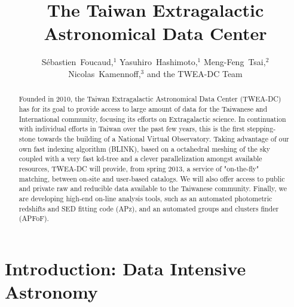 
\resetcounters





\title{The Taiwan Extragalactic Astronomical Data Center}
\author{S\'ebastien~Foucaud,$^1$ Yasuhiro~Hashimoto,$^1$ Meng-Feng~Tsai,$^2$ Nicolas~Kamennoff,$^3$ and the TWEA-DC Team
}


\begin{abstract}
Founded in 2010, the Taiwan Extragalactic Astronomical Data Center (TWEA-DC) has for its goal to provide access to large amount of data for the Taiwanese and International community, focusing its efforts on Extragalactic science. In continuation with individual efforts in Taiwan over the past few years, this is the first stepping-stone towards the building of a National Virtual Observatory.  Taking advantage of our own fast indexing algorithm (BLINK), based on a octahedral meshing of the sky coupled with a very fast kd-tree and a clever parallelization amongst available resources, TWEA-DC will provide, from spring 2013, a service of "on-the-fly" matching, between on-site and user-based catalogs.  We will also offer access to public and private raw and reducible data available to the Taiwanese community. Finally, we are developing high-end on-line analysis tools, such as an automated photometric redshifts and SED fitting code (APz), and an automated groups and clusters finder (APFoF).
\end{abstract}


\section{Introduction: Data Intensive Astronomy}

